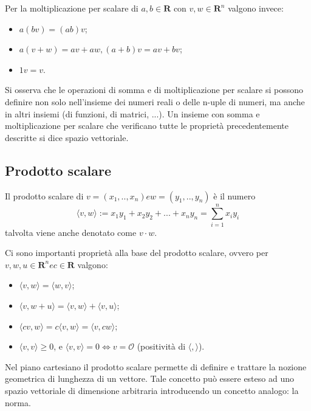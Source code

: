 Per la moltiplicazione per scalare di $a, b \in \mathbf{R}$ con $v, w \in \mathbf{R}^n$ valgono invece: 
\vspace{10pt}
\begin{itemize}
	\item $a(bv) = (ab)v$;
	\vspace{5pt}
	\item $a(v + w) = av + aw, (a + b)v = av + bv$;
	\vspace{5pt}
	\item $1v = v$.
\end{itemize}
Si osserva che le operazioni di somma e di moltiplicazione per scalare si possono definire non solo nell'insieme dei numeri reali o delle n-uple di numeri, ma anche in altri insiemi (di funzioni, di matrici, ...). Un insieme con somma e moltiplicazione per scalare che verificano tutte le proprietà precedentemente descritte si dice spazio vettoriale.

\subsection{Prodotto scalare}\label{subsec:prodotto_scalare}
Il prodotto scalare di $v = (x_1, .., x_n) e w = (y_1, .., y_n)$ è il numero
	$$\langle v,w \rangle := x_1y_1 + x_2y_2 + ... + x_ny_n = \sum_{i=1}^{n} x_iy_i$$
talvolta viene anche denotato come $v \cdot w$. 

Ci sono importanti proprietà alla base del prodotto scalare, ovvero per $v, w, u \in \mathbf{R}^n e c \in \mathbf{R}$ valgono:
\vspace{10pt}
\begin{itemize}
	\item $\langle v,w \rangle = \langle w,v \rangle$;
	\vspace{5pt}
	\item $\langle v,w + u \rangle = \langle v,w \rangle + \langle v,u \rangle$;
	\vspace{5pt}
	\item $\langle cv,w \rangle = c\langle v,w \rangle = \langle v,cw \rangle$;
	\vspace{5pt}
	\item $\langle v,v \rangle \ge 0$, e $\langle v,v \rangle = 0 \iff v = \mathcal{O}$ (positività di $\langle , \rangle$).
\end{itemize}

Nel piano cartesiano il prodotto scalare permette di definire e trattare la nozione geometrica di lunghezza di un vettore. Tale concetto può essere esteso ad uno spazio vettoriale di dimensione arbitraria introducendo un concetto analogo: la norma. 

